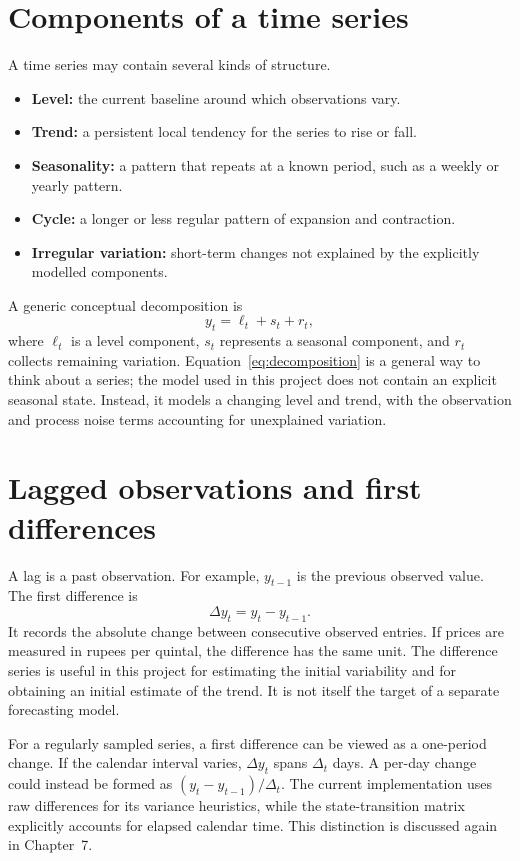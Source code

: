 \documentclass[12pt,a4paper,oneside]{report}
\numberwithin{equation}{chapter}
\numberwithin{figure}{chapter}
\numberwithin{table}{chapter}
\theoremstyle{definition}
\theoremstyle{plain}
\newcommand{\1}{\mathbf{1}}
\begin{document}
\section{Components of a time series}
A time series may contain several kinds of structure.
\begin{itemize}
  \item \textbf{Level:} the current baseline around which observations vary.
  \item \textbf{Trend:} a persistent local tendency for the series to rise or fall.
  \item \textbf{Seasonality:} a pattern that repeats at a known period, such as a weekly or yearly pattern.
  \item \textbf{Cycle:} a longer or less regular pattern of expansion and contraction.
  \item \textbf{Irregular variation:} short-term changes not explained by the explicitly modelled components.
\end{itemize}

A generic conceptual decomposition is
\begin{equation}
  y_t = \ell_t + s_t + r_t,
  \label{eq:decomposition}
\end{equation}
where $\ell_t$ is a level component, $s_t$ represents a seasonal component, and $r_t$ collects remaining variation. Equation~\eqref{eq:decomposition} is a general way to think about a series; the model used in this project does not contain an explicit seasonal state. Instead, it models a changing level and trend, with the observation and process noise terms accounting for unexplained variation.

\section{Lagged observations and first differences}
A lag is a past observation. For example, $y_{t-1}$ is the previous observed value. The first difference is
\begin{equation}
  \Delta y_t = y_t-y_{t-1}.
  \label{eq:firstdiff}
\end{equation}
It records the absolute change between consecutive observed entries. If prices are measured in rupees per quintal, the difference has the same unit. The difference series is useful in this project for estimating the initial variability and for obtaining an initial estimate of the trend. It is not itself the target of a separate forecasting model.

For a regularly sampled series, a first difference can be viewed as a one-period change. If the calendar interval varies, $\Delta y_t$ spans $\Delta_t$ days. A per-day change could instead be formed as $(y_t-y_{t-1})/\Delta_t$. The current implementation uses raw differences for its variance heuristics, while the state-transition matrix explicitly accounts for elapsed calendar time. This distinction is discussed again in Chapter~7.
\end{document}
